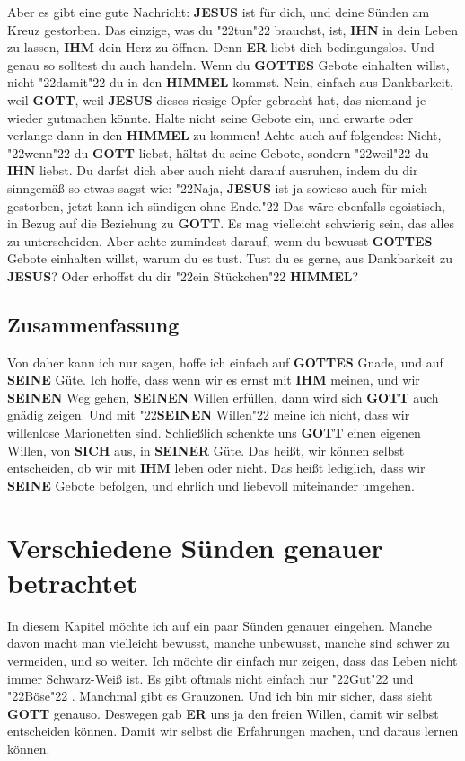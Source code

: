 \documentclass[10pt,a5paper]{article}
\newcommand{\Er}[0]{\textbf{ER}}
\newcommand{\Gottes}[0]{\textbf{GOTTES}}
\newcommand{\Gott}[0]{\textbf{GOTT}}
\newcommand{\Himmel}[0]{\textbf{HIMMEL}}
\newcommand{\Ihm}[0]{\textbf{IHM}}
\newcommand{\Ihn}[0]{\textbf{IHN}}
\newcommand{\Jesus}[0]{\textbf{JESUS}}
\newcommand{\Seinen}[0]{\textbf{SEINEN}}
\newcommand{\Seiner}[0]{\textbf{SEINER}}
\newcommand{\Seine}[0]{\textbf{SEINE}}
\newcommand{\Sich}[0]{\textbf{SICH}}
\newcommand{\q}[1]{\char"22{#1}\char"22 }
\begin{document}
		Aber es gibt eine gute Nachricht:
		{\Jesus} ist f\"ur dich,
		und deine S\"unden am Kreuz gestorben.
		Das einzige,
		was du \q{tun} brauchst,
		ist,
		{\Ihn} in dein Leben zu lassen,
		{\Ihm} dein Herz zu \"offnen.
		Denn {\Er} liebt dich bedingungslos.
		Und genau so solltest du auch handeln.
		Wenn du {\Gottes} Gebote einhalten willst,
		nicht \q{damit} du in den {\Himmel} kommst.
		Nein,
		einfach aus Dankbarkeit,
		weil {\Gott},
		weil {\Jesus} dieses riesige Opfer gebracht hat,
		das niemand je wieder gutmachen k\"onnte.
		Halte nicht seine Gebote ein,
		und erwarte oder verlange dann in den {\Himmel} zu kommen!
		Achte auch auf folgendes:
		Nicht,
		\q{wenn} du {\Gott} liebst, h\"altst du seine Gebote,
		sondern \q{weil} du {\Ihn} liebst.
		Du darfst dich aber auch nicht darauf ausruhen,
		indem du dir sinngem\"a{\ss} so etwas sagst wie:
		\q{Naja,
		{\Jesus} ist ja sowieso auch f\"ur mich gestorben,
		jetzt kann ich s\"undigen ohne Ende.}
		Das w\"are ebenfalls egoistisch,
		in Bezug auf die Beziehung zu {\Gott}.
		Es mag vielleicht schwierig sein,
		das alles zu unterscheiden.
		Aber achte zumindest darauf,
		wenn du bewusst {\Gottes} Gebote einhalten willst,
		warum du es tust.
		Tust du es gerne,
		aus Dankbarkeit zu {\Jesus}?
		Oder erhoffst du dir \q{ein St\"uckchen} {\Himmel}?
		
	\subsection{Zusammenfassung}
		Von daher kann ich nur sagen,
		hoffe ich einfach auf {\Gottes} Gnade,
		und auf {\Seine} G\"ute.
		Ich hoffe,
		dass wenn wir es ernst mit {\Ihm} meinen,
		und wir {\Seinen} Weg gehen,
		{\Seinen} Willen erf\"ullen,
		dann wird sich {\Gott} auch gn\"adig zeigen.
		Und mit \q{{\Seinen} Willen} meine ich nicht,
		dass wir willenlose Marionetten sind.
		Schlie{\ss}lich schenkte uns {\Gott} einen eigenen Willen,
		von {\Sich} aus,
		in {\Seiner} G\"ute.
		Das hei{\ss}t,
		wir k\"onnen selbst entscheiden,
		ob wir mit {\Ihm} leben oder nicht.
		Das hei{\ss}t lediglich,
		dass wir {\Seine} Gebote befolgen,
		und ehrlich und liebevoll miteinander umgehen.

	\newpage
	\section{Verschiedene S\"unden genauer betrachtet}
		In diesem Kapitel m\"ochte ich auf ein paar S\"unden genauer eingehen.
		Manche davon macht man vielleicht bewusst,
		manche unbewusst,
		manche sind schwer zu vermeiden,
		und so weiter.
		Ich m\"ochte dir einfach nur zeigen,
		dass das Leben nicht immer Schwarz-Wei{\ss} ist.
		Es gibt oftmals nicht einfach nur \q{Gut} und \q{B\"ose}.
		Manchmal gibt es Grauzonen.
		Und ich bin mir sicher,
		dass sieht {\Gott} genauso.
		Deswegen gab {\Er} uns ja den freien Willen,
		damit wir selbst entscheiden k\"onnen.
		Damit wir selbst die Erfahrungen machen,
		und daraus lernen k\"onnen.
\end{document}
